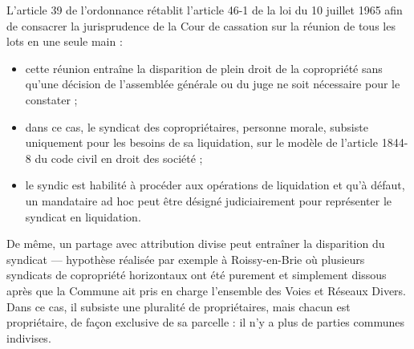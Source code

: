 		L’article 39 de l’ordonnance rétablit l’article 46-1 de la loi du 10 juillet 1965 afin de consacrer la jurisprudence de la Cour de cassation sur la réunion de tous les lots en une seule main :
		\begin{itemize}
			\item cette réunion entraîne la disparition de plein droit de la copropriété sans qu’une décision de l’assemblée générale ou du juge ne soit nécessaire pour le constater ;
			\item dans ce cas, le syndicat des copropriétaires, personne morale, subsiste uniquement pour les besoins de sa liquidation, sur le modèle de l’article 1844-8 du code civil en droit des société ;
			\item  le syndic est habilité à procéder aux opérations de liquidation et qu’à défaut, un mandataire ad hoc peut être désigné judiciairement pour représenter le syndicat en liquidation.
		\end{itemize}

		De même, un partage avec attribution divise peut entraîner la disparition du syndicat --- hypothèse réalisée par exemple à Roissy-en-Brie où plusieurs syndicats de copropriété horizontaux ont été purement et simplement dissous après que la Commune ait pris en charge l'ensemble des Voies et Réseaux Divers. Dans ce cas, il subsiste une pluralité de propriétaires, mais chacun est propriétaire, de façon exclusive de sa parcelle : il n’y a plus de parties communes indivises.
